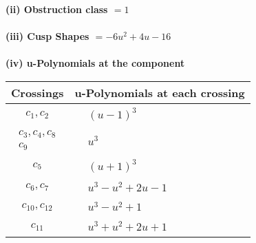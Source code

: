 \documentclass[1p]{elsarticle_modified}
\theoremstyle{definition}
\begin{document}
\flushleft \textbf{(ii) Obstruction class $= 1$}\\~\\
\flushleft \textbf{(iii) Cusp Shapes $= -6 u^2+4 u-16$}\\~\\
\newpage\renewcommand{\arraystretch}{1}
\flushleft \textbf{(iv) u-Polynomials at the component}\newline \\
\begin{tabular}{m{50pt}|m{274pt}}
Crossings & \hspace{64pt}u-Polynomials at each crossing \\
\hline $$\begin{aligned}c_{1},c_{2}\end{aligned}$$&$\begin{aligned}
&(u-1)^3
\end{aligned}$\\
\hline $$\begin{aligned}c_{3},c_{4},c_{8}\\c_{9}\end{aligned}$$&$\begin{aligned}
&u^3
\end{aligned}$\\
\hline $$\begin{aligned}c_{5}\end{aligned}$$&$\begin{aligned}
&(u+1)^3
\end{aligned}$\\
\hline $$\begin{aligned}c_{6},c_{7}\end{aligned}$$&$\begin{aligned}
&u^3- u^2+2 u-1
\end{aligned}$\\
\hline $$\begin{aligned}c_{10},c_{12}\end{aligned}$$&$\begin{aligned}
&u^3- u^2+1
\end{aligned}$\\
\hline $$\begin{aligned}c_{11}\end{aligned}$$&$\begin{aligned}
&u^3+u^2+2 u+1
\end{aligned}$\\
\hline
\end{tabular}\\~\\
\end{document}
